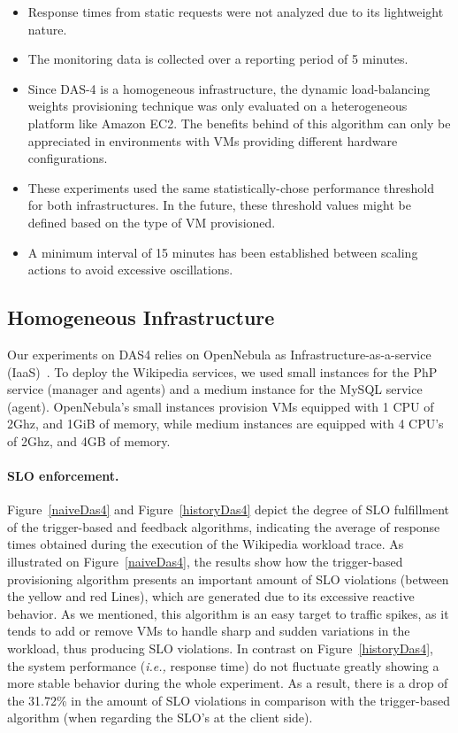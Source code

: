 \begin{itemize}
\item  Response times from static requests were not analyzed due to its lightweight nature. 

\item The monitoring data is collected over a reporting period of 5 minutes.

\item Since DAS-4 is a homogeneous infrastructure, the dynamic load-balancing weights provisioning technique was only evaluated on a heterogeneous platform like Amazon EC2. The benefits behind of this algorithm can only be appreciated in environments with VMs providing different hardware configurations. 

\item These experiments used the same statistically-chose performance threshold for both infrastructures. In the future, these threshold values might be defined based on the type of VM provisioned. 

\item A minimum interval of 15 minutes has been established between scaling actions to avoid excessive oscillations. 
\end{itemize}
\subsection*{Homogeneous Infrastructure}

Our experiments on DAS4 relies on OpenNebula as Infrastructure-as-a-service (IaaS)~\cite{sotomayor_virtual_2009}. To deploy the Wikipedia services, we used small instances for the PhP service (manager and agents) and a medium instance for the MySQL service (agent). OpenNebula's small instances provision VMs equipped with 1 CPU of 2Ghz, and 1GiB of memory, while medium instances are equipped with 4 CPU's of 2Ghz, and 4GB of memory.

\paragraph{SLO enforcement.}
Figure~\ref{naiveDas4} and Figure~\ref{historyDas4} depict the degree of SLO fulfillment of the trigger-based and feedback algorithms, indicating the average of response times obtained during the execution of the Wikipedia workload trace. As illustrated on Figure~\ref{naiveDas4}, the results show how the trigger-based provisioning algorithm presents an important amount of SLO violations (between the yellow and red Lines), which are generated due to its excessive reactive behavior. As we mentioned, this algorithm is an easy target to traffic spikes, as it tends to add or remove VMs to handle sharp and sudden variations in the workload, thus producing SLO violations. In contrast on Figure~\ref{historyDas4}, the system performance (\emph{i.e.,} response time) do not fluctuate greatly showing a more stable behavior during the whole experiment. As a result, there is a drop of the 31.72\% in the amount of SLO violations in comparison with the trigger-based algorithm (when regarding the SLO's at the client side). 


